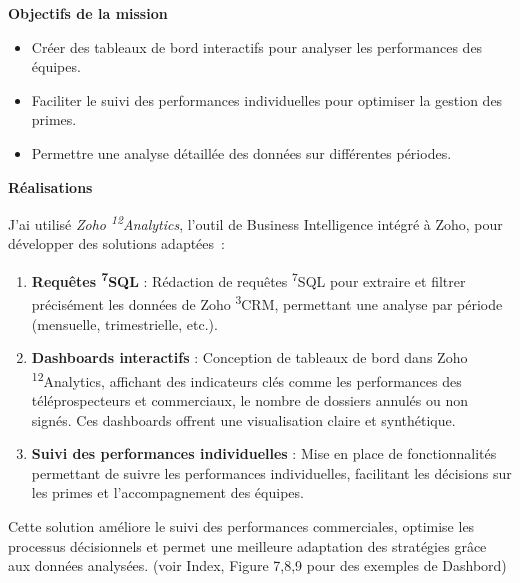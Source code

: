 \textbf{Objectifs de la mission}\vspace{0.3cm}

\begin{itemize}
    \item Créer des tableaux de bord interactifs pour analyser les performances des équipes.\vspace{0.3cm}
    \item Faciliter le suivi des performances individuelles pour optimiser la gestion des primes.\vspace{0.3cm}
    \item Permettre une analyse détaillée des données sur différentes périodes.\vspace{0.3cm}
\end{itemize}

\textbf{Réalisations}\vspace{0.3cm}

J’ai utilisé \textit{Zoho  \textsuperscript{12}Analytics}, l’outil de Business Intelligence intégré à Zoho, pour développer des solutions adaptées~:

\begin{enumerate}
    \item \textbf{Requêtes \textsuperscript{7}SQL} : Rédaction de requêtes \textsuperscript{7}SQL pour extraire et filtrer précisément les données de Zoho \textsuperscript{3}CRM, permettant une analyse par période (mensuelle, trimestrielle, etc.).\vspace{0.3cm}
    \item \textbf{Dashboards interactifs} : Conception de tableaux de bord dans  Zoho \textsuperscript{12}Analytics, affichant des indicateurs clés comme les performances des téléprospecteurs et commerciaux, le nombre de dossiers annulés ou non signés. Ces dashboards offrent une visualisation claire et synthétique.\vspace{0.3cm}
    \item \textbf{Suivi des performances individuelles} : Mise en place de fonctionnalités permettant de suivre les performances individuelles, facilitant les décisions sur les primes et l’accompagnement des équipes.\vspace{0.3cm}
\end{enumerate}

Cette solution améliore le suivi des performances commerciales, optimise les processus décisionnels et permet une meilleure adaptation des stratégies grâce aux données analysées. (voir Index, Figure 7,8,9 pour des exemples de Dashbord)

